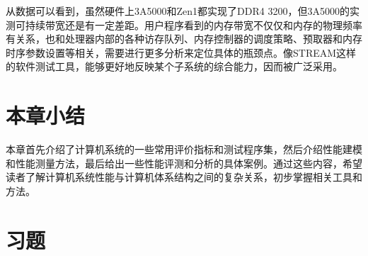 \documentclass[]{ctexbook}
\begin{document}
从数据可以看到，虽然硬件上3A5000和Zen1都实现了DDR4 3200，但3A5000的实测可持续带宽还是有一定差距。用户程序看到的内存带宽不仅仅和内存的物理频率有关系，也和处理器内部的各种访存队列、内存控制器的调度策略、预取器和内存时序参数设置等相关，需要进行更多分析来定位具体的瓶颈点。像STREAM这样的软件测试工具，能够更好地反映某个子系统的综合能力，因而被广泛采用。

\hypertarget{ux672cux7ae0ux5c0fux7ed3-10}{%
\section{本章小结}\label{ux672cux7ae0ux5c0fux7ed3-10}}

本章首先介绍了计算机系统的一些常用评价指标和测试程序集，然后介绍性能建模和性能测量方法，最后给出一些性能评测和分析的具体案例。通过这些内容，希望读者了解计算机系统性能与计算机体系结构之间的复杂关系，初步掌握相关工具和方法。

\hypertarget{ux4e60ux9898-11}{%
\section{习题}\label{ux4e60ux9898-11}}
\end{document}
